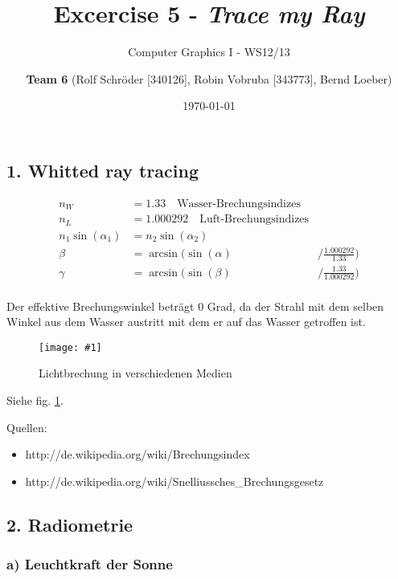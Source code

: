 \documentclass[a4paper,headings=small]{scrartcl}
\title{Excercise 5 - \emph{Trace my Ray}}
\subtitle{Computer Graphics I - WS12/13}
\author{\textbf{Team 6} (Rolf Schröder [340126], Robin Vobruba [343773], Bernd Loeber)}
\date{\today}
\numberwithin{equation}{section} %
\numberwithin{figure}{section}   %
\newcommand{\image}[3]{
	\begin{figure}[htbp]
		\centering
		\texttt{[image: \#1]}
		\caption{#3}
		\label{fig:#1}
	\end{figure}
}
\begin{document}
\maketitle

\subsection*{1. Whitted ray tracing}


\begin{align*}
n_W &= 1.33 \quad \text{Wasser-Brechungsindizes} \\
n_L &= 1.000292 \quad \text{Luft-Brechungsindizes} \\
n_1 \sin(\alpha_1) &= n_2 \sin(\alpha_2) \\
\beta &= \arcsin(\sin(\alpha) &/ \frac{1.000292}{1.33}) \\
\gamma &= \arcsin(\sin(\beta) &/ \frac{1.33}{1.000292}) \\
\end{align*}

Der effektive Brechungswinkel beträgt 0 Grad, da der Strahl mit dem selben Winkel aus dem Wasser austritt mit dem er auf das Wasser getroffen ist.

\image{img/brechungswinkel}{0.8}{Lichtbrechung in verschiedenen Medien}

Siehe fig. \ref{fig:img/brechungswinkel}.

Quellen:
\begin{itemize}
\item http://de.wikipedia.org/wiki/Brechungsindex
\item http://de.wikipedia.org/wiki/Snelliussches\_Brechungsgesetz
\end{itemize}


\subsection*{2. Radiometrie}

\subsubsection*{a) Leuchtkraft der Sonne}
\end{document}
